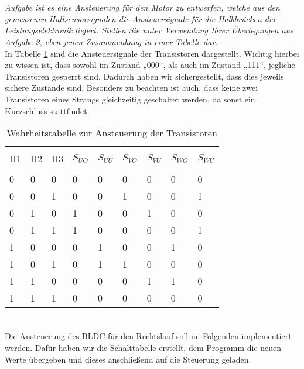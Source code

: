 \section{}\label{sec:4b}
\textit{Aufgabe ist es eine Ansteuerung für den Motor zu entwerfen, welche aus den gemessenen Hallsensorsignalen die Ansteuersignale für die Halbbrücken der Leistungselektronik liefert. Stellen Sie unter Verwendung Ihrer Überlegungen aus Aufgabe 2, eben jenen Zusammenhang in einer Tabelle dar.}\\
In Tabelle \ref{tab:4b:werte} sind die Ansteuersignale der Transistoren dargestellt. Wichtig hierbei zu wissen ist, dass sowohl im Zustand „000“, als auch im Zustand „111“, jegliche Transistoren gesperrt sind. Dadurch haben wir sichergestellt, dass dies jeweils sichere Zustände sind. Besonders zu beachten ist auch, dass keine zwei Transistoren eines Strangs gleichzeitig geschaltet werden, da sonst ein Kurzschluss stattfindet.\\
\begin{table}[h]
	\centering
	\begin{tabular}{p{1cm} p{1cm} p{1cm} | p{1cm} p{1cm} p{1cm} p{1cm} p{1cm} p{1cm}}
		&&&&&&&&\\[-1em]
		H1 & H2 & H3 & $ S_{UO} $ & $ S_{UU} $ & $ S_{VO} $ & $ S_{VU} $ & $ S_{WO} $ & $ S_{WU} $ \\
		\hline &&&&&&&&\\[-1em]
		  0 &  0 &  0 &   0 &   0 &   0 &   0 &   0 &   0 \\
		  0 &  0 &  1 &   0 &   0 &   1 &   0 &   0 &   1 \\
		  0 &  1 &  0 &   1 &   0 &   0 &   1 &   0 &   0 \\
		  0 &  1 &  1 &   1 &   0 &   0 &   0 &   0 &   1 \\
		  1 &  0 &  0 &   0 &   1 &   0 &   0 &   1 &   0 \\
		  1 &  0 &  1 &   0 &   1 &   1 &   0 &   0 &   0 \\
		  1 &  1 &  0 &   0 &   0 &   0 &   1 &   1 &   0 \\
		  1 &  1 &  1 &   0 &   0 &   0 &   0 &   0 &   0 \\
	\end{tabular}
	\caption{Wahrheitstabelle zur Ansteuerung der Transistoren}
	\label{tab:4b:werte}
\end{table}

\section{}\label{sec:4c}
Die Ansteuerung des BLDC für den Rechtslauf soll im Folgenden implementiert werden. Dafür haben wir die Schalttabelle erstellt, dem Programm die neuen Werte übergeben und dieses anschließend auf die Steuerung geladen.
